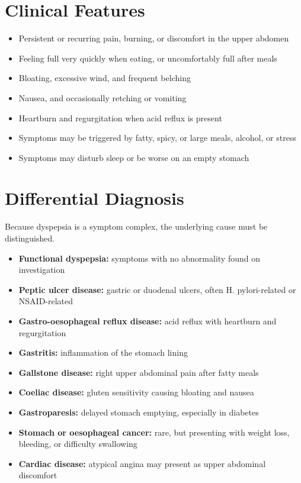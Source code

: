 \section*{Clinical Features}
\begin{itemize}
    \item Persistent or recurring pain, burning, or discomfort in the upper abdomen
    \item Feeling full very quickly when eating, or uncomfortably full after meals
    \item Bloating, excessive wind, and frequent belching
    \item Nausea, and occasionally retching or vomiting
    \item Heartburn and regurgitation when acid reflux is present
    \item Symptoms may be triggered by fatty, spicy, or large meals, alcohol, or stress
    \item Symptoms may disturb sleep or be worse on an empty stomach
\end{itemize}

\section*{Differential Diagnosis}
Because dyspepsia is a symptom complex, the underlying cause must be distinguished.
\begin{itemize}
    \item \textbf{Functional dyspepsia:} symptoms with no abnormality found on investigation
    \item \textbf{Peptic ulcer disease:} gastric or duodenal ulcers, often H. pylori-related or NSAID-related
    \item \textbf{Gastro-oesophageal reflux disease:} acid reflux with heartburn and regurgitation
    \item \textbf{Gastritis:} inflammation of the stomach lining
    \item \textbf{Gallstone disease:} right upper abdominal pain after fatty meals
    \item \textbf{Coeliac disease:} gluten sensitivity causing bloating and nausea
    \item \textbf{Gastroparesis:} delayed stomach emptying, especially in diabetes
    \item \textbf{Stomach or oesophageal cancer:} rare, but presenting with weight loss, bleeding, or difficulty swallowing
    \item \textbf{Cardiac disease:} atypical angina may present as upper abdominal discomfort
\end{itemize}

